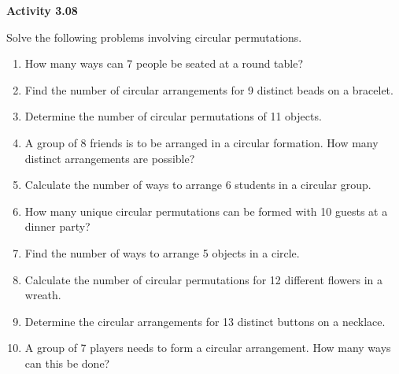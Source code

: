 \vspace{0.3ex}
\noindent\textbf{Activity 3.08}

\vspace{0.2ex}

Solve the following problems involving circular permutations.

\begin{enumerate}[label=\color{blue}\arabic*.]
    \item How many ways can 7 people be seated at a round table?
    \item Find the number of circular arrangements for 9 distinct beads on a bracelet.
    \item Determine the number of circular permutations of 11 objects.
    \item A group of 8 friends is to be arranged in a circular formation. How many distinct arrangements are possible?
    \item Calculate the number of ways to arrange 6 students in a circular group.
    \item How many unique circular permutations can be formed with 10 guests at a dinner party?
    \item Find the number of ways to arrange 5 objects in a circle.
    \item Calculate the number of circular permutations for 12 different flowers in a wreath.
    \item Determine the circular arrangements for 13 distinct buttons on a necklace.
    \item A group of 7 players needs to form a circular arrangement. How many ways can this be done?
\end{enumerate}
